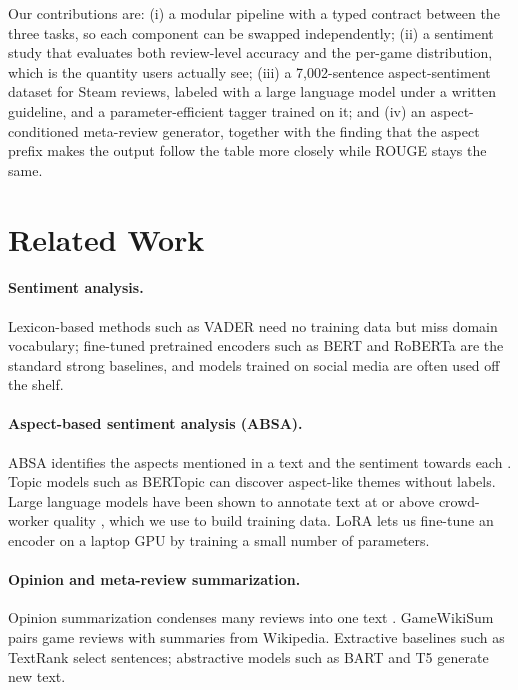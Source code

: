 \documentclass[11pt,a4paper]{article}
\begin{document}
Our contributions are: (i) a modular pipeline with a typed contract between the three tasks,
so each component can be swapped independently; (ii) a sentiment study that evaluates both
review-level accuracy and the per-game distribution, which is the quantity users actually see;
(iii) a 7,002-sentence aspect-sentiment dataset for Steam reviews, labeled with a large language
model under a written guideline, and a parameter-efficient tagger trained on it; and (iv) an
aspect-conditioned meta-review generator, together with the finding that the aspect prefix makes
the output follow the table more closely while ROUGE stays the same.

\section{Related Work}

\paragraph{Sentiment analysis.} Lexicon-based methods such as VADER \citep{hutto2014vader}
need no training data but miss domain vocabulary; fine-tuned pretrained encoders such as
BERT \citep{devlin2019bert} and RoBERTa \citep{liu2019roberta} are the standard strong
baselines, and models trained on social media \citep{barbieri2020tweeteval} are often used
off the shelf.

\paragraph{Aspect-based sentiment analysis (ABSA).} ABSA identifies the aspects mentioned in
a text and the sentiment towards each \citep{pontiki2014semeval}. Topic models such as
BERTopic \citep{grootendorst2022bertopic} can discover aspect-like themes without labels.
Large language models have been shown to annotate text at or above crowd-worker quality
\citep{gilardi2023chatgpt}, which we use to build training data. LoRA \citep{hu2022lora} lets
us fine-tune an encoder on a laptop GPU by training a small number of parameters.

\paragraph{Opinion and meta-review summarization.} Opinion summarization condenses many
reviews into one text \citep{brazinskas2020copycat}. GameWikiSum
\citep{antognini2020gamewikisum} pairs game reviews with summaries from Wikipedia.
Extractive baselines such as TextRank \citep{mihalcea2004textrank} select sentences; abstractive
models such as BART \citep{lewis2020bart} and T5 \citep{raffel2020t5} generate new text.
\end{document}
